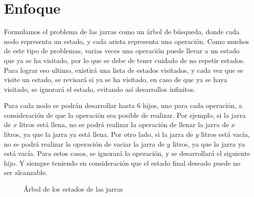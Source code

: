 \documentclass[journal]{IEEEtran}
\begin{document}
\section{Enfoque}
Formulamos el problema de las jarras como un árbol de búsqueda, donde cada nodo representa un estado, y cada arista representa una operación. Como muchos de este tipo de problemas, varias veces una operación puede llevar a un estado que ya se ha visitado, por lo que se debe de tener cuidado de no repetir estados.
Para lograr eso ultimo, existirá una lista de estados visitados, y cada vez que se visite un estado, se revisará si ya se ha visitado, en caso de que ya se haya visitado, se ignorará el estado, evitando así desarrollos infinitos.

Para cada nodo se podrán desarrollar hasta 6 hijos, uno para cada operación, a consideración de que la operación sea posible de realizar. Por ejemplo, si la jarra de $x$ litros está llena, no se podrá realizar la operación de llenar la jarra de $x$ litros, ya que la jarra ya está llena. Por otro lado, si la jarra de $y$ litros está vacía, no se podrá realizar la operación de vaciar la jarra de $y$ litros, ya que la jarra ya está vacía. Para estos casos, se ignorará la operación, y se desarrollará el siguiente hijo.
Y siempre teniendo en consideración que el estado final deseado puede no ser alcanzable.

\begin{figure}[h]
  \centering
  \caption{Árbol de los estados de las jarras}
  \label{fig:arbol}
\end{figure}
\end{document}

